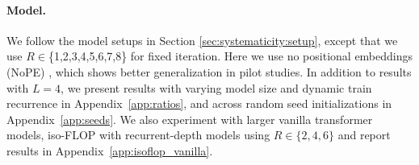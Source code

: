 \documentclass{article} %
\begin{document}
\paragraph{Model.} 
We follow the model setups in Section \ref{sec:systematicity:setup}, except that we use $R \in $\{1,2,3,4,5,6,7,8\} for fixed iteration.
Here we use no positional embeddings (NoPE) \citep{kazemnejad2023impact, wang2024length}, which shows better generalization in pilot studies. 
In addition to results with $L=4$, we present results with varying model size and dynamic train recurrence in Appendix~\ref{app:ratios}, and across random seed initializations in Appendix~\ref{app:seeds}. We also experiment with larger vanilla transformer models, iso-FLOP with recurrent-depth models using \(R \in \{2,4,6\}\) and report results in Appendix~\ref{app:isoflop_vanilla}.
\end{document}
